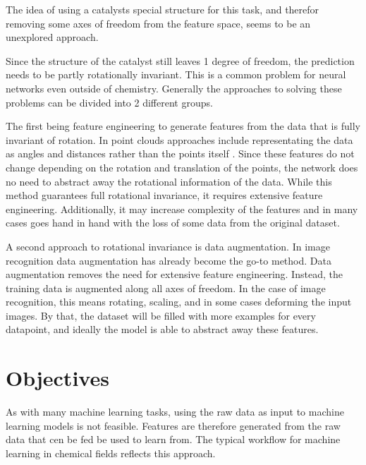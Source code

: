 The idea of using a catalysts special structure for this task, and therefor removing some axes of freedom from the feature space, seems to be an unexplored approach.

Since the structure of the catalyst still leaves 1 degree of freedom, the prediction needs to be partly rotationally invariant.
This is a common problem for neural networks even outside of chemistry.
Generally the approaches to solving these problems can be divided into 2 different groups.

The first being feature engineering to generate features from the data that is fully invariant of rotation.
In point clouds approaches include representating the data as angles and distances rather than the points itself \cite{8886052,weiler20183d}.
Since these features do not change depending on the rotation and translation of the points, the network does no need to 
abstract away the rotational information of the data.
While this method guarantees full rotational invariance, it requires extensive feature engineering.
Additionally, it may increase complexity of the features and in many cases 
goes hand in hand with the loss of some data from the original dataset. %

A second approach to rotational invariance is data augmentation.
In image recognition data augmentation has already become the go-to method.
Data augmentation removes the need for extensive feature engineering.
Instead, the training data is augmented along all axes of freedom.
In the case of image recognition, this means rotating, scaling, and in some cases deforming the input images.
By that, the dataset will be filled with more examples for every datapoint, and ideally the model is able to 
abstract away these features. %

\section{Objectives}

As with many machine learning tasks, using the raw data as input to machine learning models is not feasible.
Features are therefore generated from the raw data that cen be fed be used to learn from.
The typical workflow for machine learning in chemical fields reflects this approach.

